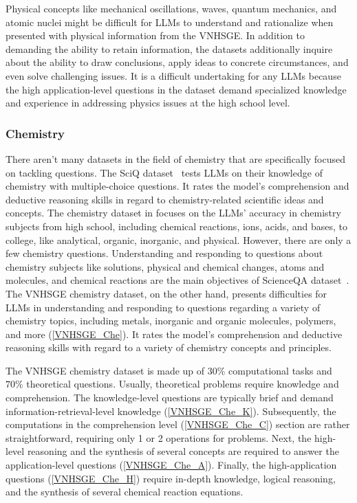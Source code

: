 \documentclass{article}
\begin{document}
{	Physical concepts like mechanical oscillations, waves, quantum mechanics, and atomic nuclei might be difficult for LLMs to understand and rationalize when presented with physical information from the VNHSGE. In addition to demanding the ability to retain information, the datasets additionally inquire about the ability to draw conclusions, apply ideas to concrete circumstances, and even solve challenging issues. It is a difficult undertaking for any LLMs because the high application-level questions in the dataset demand specialized knowledge and experience in addressing physics issues at the high school level.
	
	\subsubsection{Chemistry}
	
	There aren't many datasets in the field of chemistry that are specifically focused on tackling questions. The SciQ dataset~\cite{welbl2017crowdsourcing} tests LLMs on their knowledge of chemistry with multiple-choice questions. It rates the model's comprehension and deductive reasoning skills in regard to chemistry-related scientific ideas and concepts. The chemistry dataset in \cite{hendrycks2020measuring} focuses on the LLMs' accuracy in chemistry subjects from high school, including chemical reactions, ions, acids, and bases, to college, like analytical, organic, inorganic, and physical. However, there are only a few chemistry questions. Understanding and responding to questions about chemistry subjects like solutions, physical and chemical changes, atoms and molecules, and chemical reactions are the main objectives of ScienceQA dataset~\cite{lu2022learn}. The VNHSGE chemistry dataset, on the other hand, presents difficulties for LLMs in understanding and responding to questions regarding a variety of chemistry topics, including metals, inorganic and organic molecules, polymers, and more (\ref{VNHSGE_Che}). It rates the model's comprehension and deductive reasoning skills with regard to a variety of chemistry concepts and principles.
	
	The VNHSGE chemistry dataset is made up of $30\%$ computational tasks and $70\%$ theoretical questions. Usually, theoretical problems require knowledge and comprehension. The knowledge-level questions are typically brief and demand information-retrieval-level knowledge (\ref{VNHSGE_Che_K}). Subsequently, the computations in the comprehension level (\ref{VNHSGE_Che_C}) section are rather straightforward, requiring only 1 or 2 operations for problems. Next, the high-level reasoning and the synthesis of several concepts are required to answer the application-level questions (\ref{VNHSGE_Che_A}). Finally, the high-application questions (\ref{VNHSGE_Che_H}) require in-depth knowledge, logical reasoning, and the synthesis of several chemical reaction equations.
	
}
\end{document}
